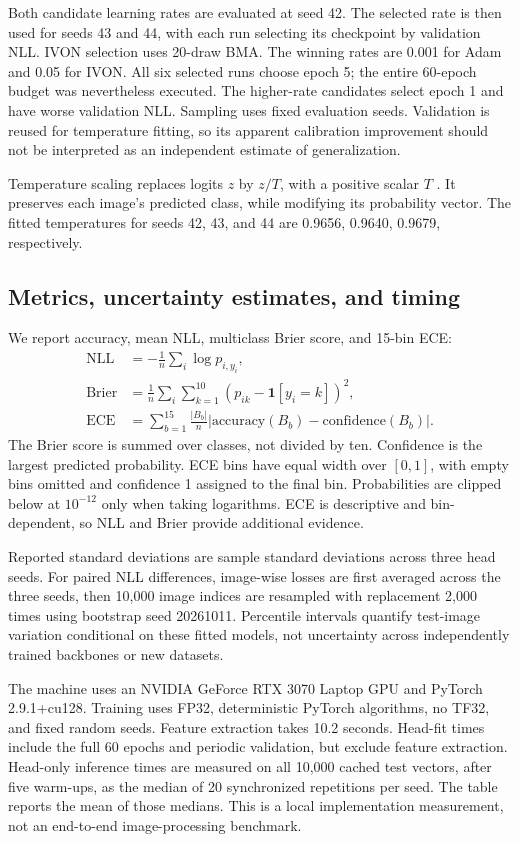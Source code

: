 \documentclass[11pt,a4paper]{article}
\begin{document}
Both candidate learning rates are evaluated at seed 42. The selected rate is then
used for seeds 43 and 44, with each run selecting its checkpoint by validation
NLL. IVON selection uses 20-draw BMA. The winning rates are 0.001 for Adam and
0.05 for IVON. All six selected runs choose epoch 5; the entire 60-epoch budget
was nevertheless executed. The higher-rate candidates select epoch 1 and have
worse validation NLL. Sampling uses fixed evaluation seeds. Validation is
reused for temperature fitting, so its apparent calibration improvement should
not be interpreted as an independent estimate of generalization.

Temperature scaling replaces logits $z$ by $z/T$, with a positive scalar $T$
\cite{guo}. It preserves each image's predicted class, while modifying its
probability vector. The fitted temperatures for seeds 42, 43, and 44 are
0.9656, 0.9640, 0.9679, respectively.

\subsection{Metrics, uncertainty estimates, and timing}
We report accuracy, mean NLL, multiclass Brier score, and 15-bin ECE:
\begin{align}
 \mathrm{NLL}&=-\frac{1}{n}\sum_i\log p_{i,y_i},\\
 \mathrm{Brier}&=\frac{1}{n}\sum_i\sum_{k=1}^{10}(p_{ik}-\mathbf{1}[y_i=k])^2,\\
 \mathrm{ECE}&=\sum_{b=1}^{15}\frac{|B_b|}{n}
 |\mathrm{accuracy}(B_b)-\mathrm{confidence}(B_b)|.
\end{align}
The Brier score is summed over classes, not divided by ten. Confidence is the
largest predicted probability. ECE bins have equal width over $[0,1]$, with empty
bins omitted and confidence 1 assigned to the final bin. Probabilities are
clipped below at $10^{-12}$ only when taking logarithms. ECE is descriptive and
bin-dependent, so NLL and Brier provide additional evidence.

Reported standard deviations are sample standard deviations across three head
seeds. For paired NLL differences, image-wise losses are first averaged across
the three seeds, then 10,000 image indices are resampled with replacement 2,000
times using bootstrap seed 20261011. Percentile intervals quantify test-image
variation conditional on these fitted models, not uncertainty across independently
trained backbones or new datasets.

The machine uses an NVIDIA GeForce RTX 3070 Laptop GPU and PyTorch 2.9.1+cu128.
Training uses FP32, deterministic PyTorch algorithms, no TF32, and fixed random
seeds. Feature extraction takes 10.2 seconds. Head-fit times include
the full 60 epochs and periodic validation, but exclude feature extraction.
Head-only inference times are measured on all 10,000 cached test vectors, after
five warm-ups, as the median of 20 synchronized repetitions per seed. The table
reports the mean of those medians. This is a local implementation measurement,
not an end-to-end image-processing benchmark.
\end{document}
